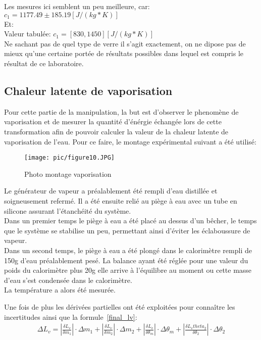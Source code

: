 Les mesures ici semblent un peu meilleure, car:\\
$c_1 = 1177.49 \pm 185.19[J/ (kg*K)]$\\
Et:\\
Valeur tabulée: $c_1 = [830,1450][J/ (kg*K)]$\\
Ne sachant pas de quel type de verre il s'agit exactement, on ne dipose pas de mieux qu'une certaine portée de résultats possibles dans lequel est compris le résultat de ce laboratoire.

\subsection{Chaleur latente de vaporisation}
Pour cette partie de la manipulation, la but est d'observer le phenomène de vaporisation et de mesurer la quantité d'énérgie échangée lors de cette transformation afin de pouvoir calculer la valeur de la chaleur latente de vaporisation de l'eau.
Pour ce faire, le montage expérimental suivant a été utilisé:

\begin{figure}[!h]
    \centering
    \caption{Photo montage vaporisation}
    \texttt{[image: pic/figure10.JPG]}
\end{figure}

Le générateur de vapeur a préalablement été rempli d'eau distillée et soigneusement refermé. Il a été ensuite relié au piège à eau avec un tube en silicone assurant l'étanchéité du système.\\
Dans un premier temps le piège à eau a été placé au dessus d'un bêcher, le temps que le système se stabilise un peu, permettant ainsi d'éviter les éclaboussure de vapeur.\\
Dans un second temps, le piège à eau a été plongé dans le calorimètre rempli de 150g d'eau préalablement pesé. La balance ayant été réglée pour une valeur du poids du calorimètre plus 20g elle arrive à l'équilibre au moment ou cette masse d'eau s'est condensée dans le calorimètre.\\
La température a alors été mesurée.

Une fois de plus les dérivées partielles ont été exploitées pour connaître les incertitudes ainsi que la formule~\eqref{final_lv}:
\begin{align*}
    \Delta L_v = |\frac{\delta L_v}{\delta m_1}|\cdot \Delta m_1 + |\frac{\delta L_v}{\delta m_2}|\cdot \Delta m_2 + |\frac{\delta L_v}{\delta \theta_m}|\cdot \Delta \theta_m + |\frac{\delta L_vtheta_2}{\delta \theta_2}|\cdot \Delta \theta_2
\end{align*}

